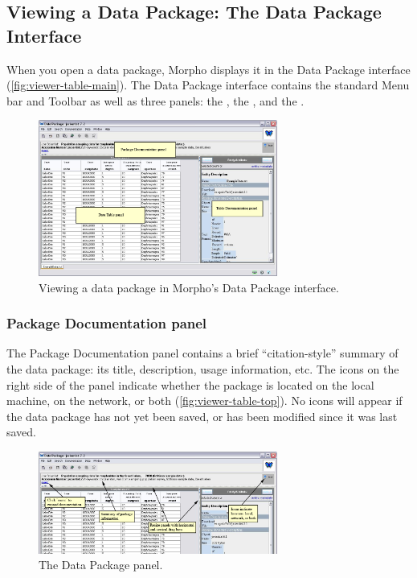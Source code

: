\subsection{Viewing a Data Package: The Data Package Interface}

When you open a data package, Morpho displays it in the Data Package
interface (\autoref{fig:viewer-table-main}). The Data Package interface
contains the standard Menu bar and Toolbar as well as three panels: the
, the , and the
.

\begin{figure}
  \centering
    \includegraphics[width=0.7\textwidth]{images/viewer-table-main.jpg}
  \caption{Viewing a data package in Morpho's Data Package interface.}
  \label{fig:viewer-table-main}
\end{figure}

\subsubsection{Package Documentation panel} \label{sec:panel-dp-doc}

The Package Documentation panel contains a brief ``citation-style''
summary of the data package: its title, description, usage information,
etc. The icons on the right side of the panel indicate whether the
package is located on the local machine, on the network, or both
(\autoref{fig:viewer-table-top}). No icons will appear if the data
package has not yet been saved, or has been modified since it was last
saved.
 
\begin{figure}
  \centering
    \includegraphics[width=0.7\textwidth]{images/viewer-table-top.jpg}
  \caption{The Data Package panel.}
  \label{fig:viewer-table-top}
\end{figure}

